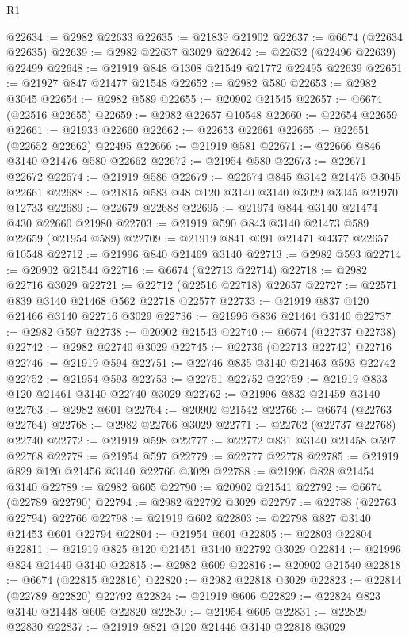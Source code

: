 \begin{lexlean}{R1}
\begin{coremodule}
@22634 := @2982 @22633
@22635 := @21839 @21902
@22637 := @6674 (@22634 @22635)
@22639 := @2982 @22637 @3029
@22642 := @22632 (@22496 @22639) @22499
@22648 := @21919 @848 @1308 @21549 @21772 @22495 @22639
@22651 := @21927 @847 @21477 @21548
@22652 := @2982 @580
@22653 := @2982 @3045
@22654 := @2982 @589
@22655 := @20902 @21545
@22657 := @6674 (@22516 @22655)
@22659 := @2982 @22657 @10548
@22660 := @22654 @22659
@22661 := @21933 @22660
@22662 := @22653 @22661
@22665 := @22651 (@22652 @22662) @22495
@22666 := @21919 @581
@22671 := @22666 @846 @3140 @21476 @580 @22662
@22672 := @21954 @580
@22673 := @22671 @22672
@22674 := @21919 @586
@22679 := @22674 @845 @3142 @21475 @3045 @22661
@22688 := @21815 @583 @48 @120 @3140 @3140 @3029 @3045 @21970 @12733
@22689 := @22679 @22688
@22695 := @21974 @844 @3140 @21474 @430 @22660 @21980
@22703 := @21919 @590 @843 @3140 @21473 @589 @22659 (@21954 @589)
@22709 := @21919 @841 @391 @21471 @4377 @22657 @10548
@22712 := @21996 @840 @21469 @3140
@22713 := @2982 @593
@22714 := @20902 @21544
@22716 := @6674 (@22713 @22714)
@22718 := @2982 @22716 @3029
@22721 := @22712 (@22516 @22718) @22657
@22727 := @22571 @839 @3140 @21468 @562 @22718 @22577
@22733 := @21919 @837 @120 @21466 @3140 @22716 @3029
@22736 := @21996 @836 @21464 @3140
@22737 := @2982 @597
@22738 := @20902 @21543
@22740 := @6674 (@22737 @22738)
@22742 := @2982 @22740 @3029
@22745 := @22736 (@22713 @22742) @22716
@22746 := @21919 @594
@22751 := @22746 @835 @3140 @21463 @593 @22742
@22752 := @21954 @593
@22753 := @22751 @22752
@22759 := @21919 @833 @120 @21461 @3140 @22740 @3029
@22762 := @21996 @832 @21459 @3140
@22763 := @2982 @601
@22764 := @20902 @21542
@22766 := @6674 (@22763 @22764)
@22768 := @2982 @22766 @3029
@22771 := @22762 (@22737 @22768) @22740
@22772 := @21919 @598
@22777 := @22772 @831 @3140 @21458 @597 @22768
@22778 := @21954 @597
@22779 := @22777 @22778
@22785 := @21919 @829 @120 @21456 @3140 @22766 @3029
@22788 := @21996 @828 @21454 @3140
@22789 := @2982 @605
@22790 := @20902 @21541
@22792 := @6674 (@22789 @22790)
@22794 := @2982 @22792 @3029
@22797 := @22788 (@22763 @22794) @22766
@22798 := @21919 @602
@22803 := @22798 @827 @3140 @21453 @601 @22794
@22804 := @21954 @601
@22805 := @22803 @22804
@22811 := @21919 @825 @120 @21451 @3140 @22792 @3029
@22814 := @21996 @824 @21449 @3140
@22815 := @2982 @609
@22816 := @20902 @21540
@22818 := @6674 (@22815 @22816)
@22820 := @2982 @22818 @3029
@22823 := @22814 (@22789 @22820) @22792
@22824 := @21919 @606
@22829 := @22824 @823 @3140 @21448 @605 @22820
@22830 := @21954 @605
@22831 := @22829 @22830
@22837 := @21919 @821 @120 @21446 @3140 @22818 @3029

\end{coremodule}
\end{lexlean}
